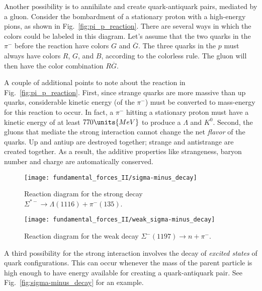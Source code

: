 Another possibility is to annihilate and create quark-antiquark pairs,
mediated by a gluon.  Consider the bombardment of a stationary proton
with a high-energy pions, as shown in Fig.~\ref{fig:pi_p_reaction}.
There are several ways in which the colors could be labeled in this
diagram.  Let's assume that the two quarks in the $\pi^-$ before the
reaction have colors $G$ and $\overline G$.  The three quarks in the
$p$ must always have colors $R$, $G$, and $B$, according to the
colorless rule.  The gluon will then have the color combination
$R\overline G$.

A couple of additional points to note about the reaction in
Fig.~\ref{fig:pi_p_reaction}. First, since strange quarks are more
massive than up quarks, considerable kinetic energy (of the $\pi^-$)
must be converted to mass-energy for this reaction to occur.  In fact,
a $\pi^-$ hitting a stationary proton must have a kinetic energy of at
least $770\units{MeV}$ to produce a $\Lambda$ and $K^0$.  Second, the gluons
that mediate the strong interaction cannot change the net {\em flavor}
of the quarks.  Up and antiup are destroyed together; strange and
antistrange are created together.  As a result, the additive
properties like strangeness, baryon number and charge are
automatically conserved.

\begin{figure}[tbp]
\begin{minipage}{6cm}
\begin{center}
\texttt{[image: fundamental\_forces\_II/sigma-minus\_decay]}
\caption{Reaction diagram for the strong decay $\Sigma^{\ast -} \to
  \Lambda(1116) + \pi^-(135)$.}
\label{fig:sigma-minus_decay}
\end{center}
\end{minipage}
\hfill
\begin{minipage}{6cm}
\begin{center}
\texttt{[image: fundamental\_forces\_II/weak\_sigma-minus\_decay]}
\caption{Reaction diagram for the weak decay $\Sigma^-(1197) \to n +
  \pi^-$.}
\label{fig:weak_sigma-minus_decay}
\end{center}
\end{minipage}
\end{figure}


A third possibility for the strong interaction involves the decay of
{\em excited states} of quark configurations.  This can occur whenever
the mass of the parent particle is high enough to have energy
available for creating a quark-antiquark pair.  See
Fig.~\ref{fig:sigma-minus_decay} for an example.

